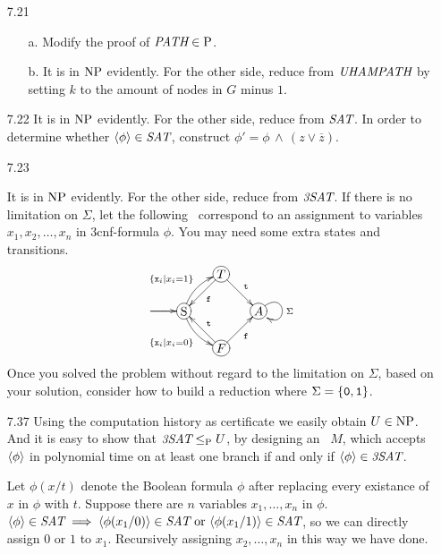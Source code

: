 \begin{itemize}
	\item[7.21]
	\begin{itemize}
		\item[a.] Modify the proof of $\textit{PATH} \in \Poly$.
		\item[b.] It is in $\NPoly$ evidently. For the other side, reduce from $\IT{UHAMPATH}$ by setting $k$ to the amount of nodes in $G$ minus $1$.
	\end{itemize}

	\item[7.22]
	It is in $\NPoly$ evidently. For the other side, reduce from $\IT{SAT}$. In order to determine whether $\Bra{\phi} \in \IT{SAT}$, construct $\phi' = \phi \,\wedge\,(z \vee \overline{z})$.
	
	\item[7.23]
	\Omit
	
	\item[\Star 7.36] 
	It is in $\NPoly$ evidently. For the other side, reduce from $\IT{3SAT}$. If there is no limitation on $\Sigma$, let the following \DFA\ correspond to an assignment to variables $x_1, x_2, \dots, x_n$ in 3cnf-formula $\phi$. You may need some extra states and transitions.
	$$
		\xymatrix@ur@R=2pc@C=2pc{
			*+[o][F-]{\RM{S}} \ar@(l,l)[]^{} \ar@/^/[r]^{\{ \TT{x}_i | x_i = 1 \}} \ar@/_/[d]_{\{ \TT{x}_i | x_i = 0 \}} &
			*+[o][F-]{T} \ar^{\TT{t}}[d] \ar^{\TT{f}}[l] \\
			*+[o][F-]{F} \ar_{\TT{f}}[r] \ar_{\TT{t}}[u] & 
			*+[o][F-]{A} \ar@(ur,rd)[]^{\Sigma}
		}
	$$
	Once you solved the problem without regard to the limitation on $\Sigma$, based on your solution, consider how to build a reduction where $\Sigma = \{ \TT{0}, \TT{1} \}$.
	
	\item[7.37]
	Using the computation history as certificate we easily obtain $U \in \NPoly$. And it is easy to show that $\IT{3SAT} \LeqP U$, by designing an \NTM\ $M$, which accepts $\Bra{\phi}$ in polynomial time on at least one branch if and only if $\Bra{\phi} \in \IT{3SAT}$.
	
	\item[\Star 7.38]
	Let $\phi(x/t)$ denote the Boolean formula $\phi$ after replacing every existance of $x$ in $\phi$ with $t$. Suppose there are $n$ variables $x_1, \dots, x_n$ in $\phi$. $\Bra{\phi} \in \IT{SAT} \implies \Bra{\phi(x_1/0)} \in \IT{SAT} \text{ or } \Bra{\phi(x_1/1)} \in \IT{SAT}$, so we can directly assign $0$ or $1$ to $x_1$. Recursively assigning $x_2, \dots, x_n$ in this way we have done.
	

\end{itemize}
